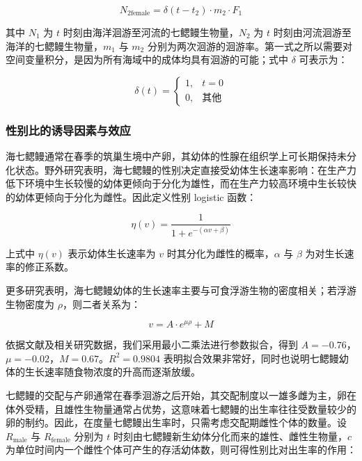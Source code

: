\documentclass[11pt,a4paper]{ctexart}
\begin{document}
\begin{equation}
N_{2\mathrm{female}}=\delta(t-t_2)\cdot m_2\cdot F_1
\end{equation}

其中 $N_1$ 为 $t$ 时刻由海洋洄游至河流的七鳃鳗生物量，$N_2$ 为 $t$ 时刻由河流洄游至海洋的七鳃鳗生物量，$m_1$ 与 $m_2$ 分别为两次洄游的洄游率。第一式之所以需要对空间变量积分，是因为所有海域中的成体均具有洄游的可能；式中 $\delta$ 可表示为：

\begin{equation}
\delta(t)=
\begin{cases}
1, & t=0\\
0, & \text{其他}
\end{cases}
\end{equation}

\subsubsection{性别比的诱导因素与效应}

海七鳃鳗通常在春季的筑巢生境中产卵，其幼体的性腺在组织学上可长期保持未分化状态。野外研究表明，海七鳃鳗的性别决定直接受幼体生长速率影响：在生产力低下环境中生长较慢的幼体更倾向于分化为雄性，而在生产力较高环境中生长较快的幼体更倾向于分化为雌性\cite{10}。因此定义性别 logistic 函数：

\begin{equation}
\eta(v)=\frac{1}{1+e^{-(\alpha v+\beta)}}
\end{equation}

上式中 $\eta(v)$ 表示幼体生长速率为 $v$ 时其分化为雌性的概率，$\alpha$ 与 $\beta$ 为对生长速率的修正系数。

更多研究表明\cite{11}，海七鳃鳗幼体的生长速率主要与可食浮游生物的密度相关；若浮游生物密度为 $\rho$，则二者关系为：

\begin{equation}
v=A\cdot e^{\mu\rho}+M
\end{equation}

依据文献\cite{11}及相关研究数据，我们采用最小二乘法进行参数拟合，得到 $A=-0.76$，$\mu=-0.02$，$M=0.67$。$R^2=0.9804$ 表明拟合效果非常好，同时也说明七鳃鳗幼体的生长速率随食物浓度的升高而逐渐放缓。

七鳃鳗的交配与产卵通常在春季洄游之后开始，其交配制度以一雄多雌为主，卵在体外受精，且雄性生物量通常占优势\cite{12}，这意味着七鳃鳗的出生率往往受数量较少的卵的制约。因此，在度量七鳃鳗出生率时，只需考虑交配期雌性个体的数量。设 $R_{\mathrm{male}}$ 与 $R_{\mathrm{female}}$ 分别为 $t$ 时刻由七鳃鳗新生幼体分化而来的雄性、雌性生物量，$c$ 为单位时间内一个雌性个体可产生的存活幼体数，则可得性别比对出生率的作用：
\end{document}
